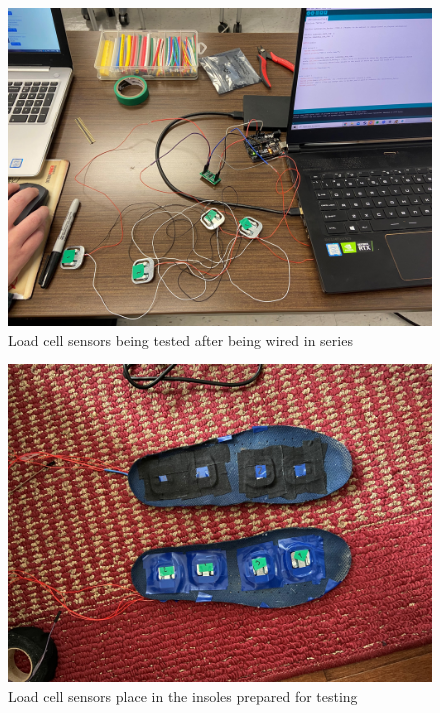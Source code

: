 \documentclass[11pt,letterpaper]{article}
\begin{document}
\begin{figure}[htbp]
\centering
\includegraphics[scale=0.1]{Progress_Report/figs/Loadcell_sensors.jpg}
\caption{Load cell sensors being tested after being wired in series}
\label{fig:loadcell}
\end{figure}
\begin{figure}[htbp]
\centering
\includegraphics[scale=0.1]{Progress_Report/figs/Loadcell_sensors_sole.jpg}
\caption{Load cell sensors place in the insoles prepared for testing}
\label{fig:loadcell}
\end{figure}
\end{document}
